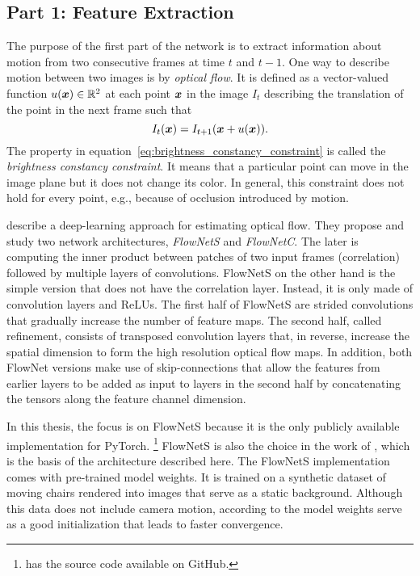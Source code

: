 		\subsection{Part 1: Feature Extraction}
			The purpose of the first part of the network is to extract information about motion from two consecutive frames at time $t$ and $t - 1$.
			One way to describe motion between two images is by \emph{optical flow}.
			It is defined as a vector-valued function $u(\bm{x}) \in \mathbb{R}^2$ at each point $\bm{x}$ in the image $I_{t}$ describing the translation of the point in the next frame such that
			\begin{equation}\label{eq:brightness_constancy_constraint}
				I_{t}(\bm{x}) = I_{t + 1}(\bm{x} + u(\bm{x})).
			\end{equation}
			The property in equation~\ref{eq:brightness_constancy_constraint} is called the \emph{brightness constancy constraint}. 
			It means that a particular point can move in the image plane but it does not change its color.
			In general, this constraint does not hold for every point, e.g., because of occlusion introduced by motion.
			
			\cite{dosovitskiy2015flownet} describe a deep-learning approach for estimating optical flow.
			They propose and study two network architectures, \emph{FlowNetS} and \emph{FlowNetC}.
			The later is computing the inner product between patches of two input frames (correlation) followed by multiple layers of convolutions.
			FlowNetS on the other hand is the simple version that does not have the correlation layer. 
			Instead, it is only made of convolution layers and ReLUs.
			The first half of FlowNetS are strided convolutions that gradually increase the number of feature maps. 
			The second half, called refinement, consists of transposed convolution layers that, in reverse, increase the spatial dimension to form the high resolution optical flow maps.
			In addition, both FlowNet versions make use of skip-connections that allow the features from earlier layers to be added as input to layers in the second half by concatenating the tensors along the feature channel dimension. 
			
			In this thesis, the focus is on FlowNetS because it is the only publicly available implementation for PyTorch.%
			\footnote{\citet*{flownetpytorch} has the source code available on GitHub.}
			FlowNetS is also the choice in the work of \citeauthor{wang2017deepvo}, which is the basis of the architecture described here.
			The FlowNetS implementation comes with pre-trained model weights.
			It is trained on a synthetic dataset of moving chairs rendered into images that serve as a static background.
			Although this data does not include camera motion, according to \mbox{\citeauthor{wang2017deepvo}} the model weights serve as a good initialization that leads to faster convergence. 
			
